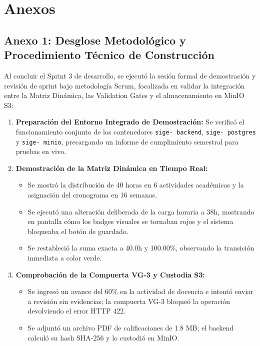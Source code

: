 \documentclass[12pt,a4paper]{article}
\begin{document}
\vspace{0.4cm}

\section{Anexos}

\subsection*{Anexo 1: Desglose Metodológico y Procedimiento Técnico de Construcción}
Al concluir el Sprint 3 de desarrollo, se ejecutó la sesión formal de demostración y revisión de sprint bajo metodología Scrum, focalizada en validar la integración entre la Matriz Dinámica, las Validation Gates y el almacenamiento en MinIO S3:

\begin{enumerate}[leftmargin=1.5em, itemsep=3pt]
    \item \textbf{Preparación del Entorno Integrado de Demostración:} Se verificó el funcionamiento conjunto de los contenedores \texttt{sige- backend}, \texttt{sige- postgres} y \texttt{sige- minio}, precargando un informe de cumplimiento semestral para pruebas en vivo.
    \item \textbf{Demostración de la Matriz Dinámica en Tiempo Real:}
    \begin{itemize}[leftmargin=1.2em, itemsep=2pt]
        \item Se mostró la distribución de 40 horas en 6 actividades académicas y la asignación del cronograma en 16 semanas.
        \item Se ejecutó una alteración deliberada de la carga horaria a 38h, mostrando en pantalla cómo los badges visuales se tornaban rojos y el sistema bloqueaba el botón de guardado.
        \item Se restableció la suma exacta a 40.0h y 100.00\%, observando la transición inmediata a color verde.
    \end{itemize}
    \item \textbf{Comprobación de la Compuerta VG-3 y Custodia S3:}
    \begin{itemize}[leftmargin=1.2em, itemsep=2pt]
        \item Se ingresó un avance del 60\% en la actividad de docencia e intentó enviar a revisión sin evidencias; la compuerta VG-3 bloqueó la operación devolviendo el error HTTP 422.
        \item Se adjuntó un archivo PDF de calificaciones de 1.8 MB; el backend calculó su hash SHA-256 y lo custodió en MinIO.

\end{itemize}
\end{enumerate}
\end{document}
